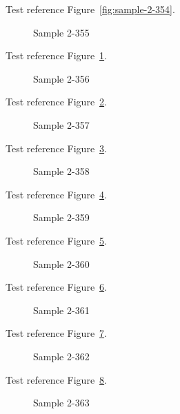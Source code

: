 Test reference Figure~\ref{fig:sample-2-354}.

\begin{figure}[tbhp]
\caption{Sample 2-355}
\label{fig:sample-2-355}
\end{figure}

Test reference Figure~\ref{fig:sample-2-355}.

\begin{figure}[tbhp]
\caption{Sample 2-356}
\label{fig:sample-2-356}
\end{figure}

Test reference Figure~\ref{fig:sample-2-356}.

\begin{figure}[tbhp]
\caption{Sample 2-357}
\label{fig:sample-2-357}
\end{figure}

Test reference Figure~\ref{fig:sample-2-357}.

\begin{figure}[tbhp]
\caption{Sample 2-358}
\label{fig:sample-2-358}
\end{figure}

Test reference Figure~\ref{fig:sample-2-358}.

\begin{figure}[tbhp]
\caption{Sample 2-359}
\label{fig:sample-2-359}
\end{figure}

Test reference Figure~\ref{fig:sample-2-359}.

\begin{figure}[tbhp]
\caption{Sample 2-360}
\label{fig:sample-2-360}
\end{figure}

Test reference Figure~\ref{fig:sample-2-360}.

\begin{figure}[tbhp]
\caption{Sample 2-361}
\label{fig:sample-2-361}
\end{figure}

Test reference Figure~\ref{fig:sample-2-361}.

\begin{figure}[tbhp]
\caption{Sample 2-362}
\label{fig:sample-2-362}
\end{figure}

Test reference Figure~\ref{fig:sample-2-362}.

\begin{figure}[tbhp]
\caption{Sample 2-363}
\label{fig:sample-2-363}
\end{figure}

